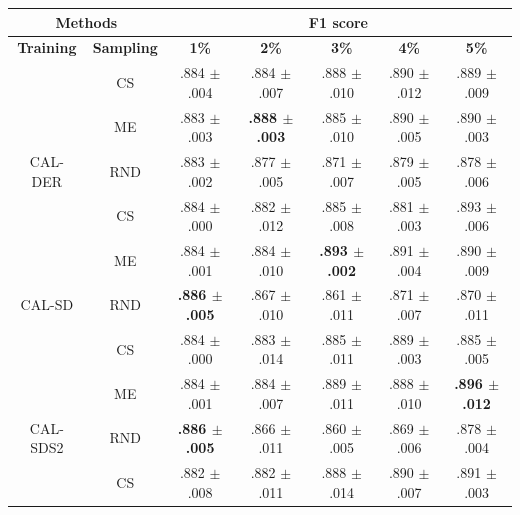 \begin{table}[htbp]
\centering

\begin{tabular*}{\linewidth}{c|c|@{\extracolsep{\fill}}ccccc}
\toprule
\multicolumn{2}{c|}{\textbf{Methods}} & \multicolumn{5}{c}{\textbf{F1 score}} \\
\midrule
\textbf{Training} & \textbf{Sampling} & \textbf{1\%} & \textbf{2\%} & \textbf{3\%} & \textbf{4\%} & \textbf{5\%}\\
\midrule
 & CS & .884 $\pm$ {\small .004} & .884 $\pm$ {\small .007} & .888 $\pm$ {\small .010} & .890 $\pm$ {\small .012} & .889 $\pm$ {\small .009}\\

 & ME & .883 $\pm$ {\small .003} & \textbf{.888 $\pm$ {\small .003}} & .885 $\pm$ {\small .010} & .890 $\pm$ {\small .005} & .890 $\pm$ {\small .003}\\

\multirow{-3}{*}{\raggedright\arraybackslash CAL-DER} & RND & .883 $\pm$ {\small .002} & .877 $\pm$ {\small .005} & .871 $\pm$ {\small .007} & .879 $\pm$ {\small .005} & .878 $\pm$ {\small .006}\\
\midrule
 & CS & .884 $\pm$ {\small .000} & .882 $\pm$ {\small .012} & .885 $\pm$ {\small .008} & .881 $\pm$ {\small .003} & .893 $\pm$ {\small .006}\\

 & ME & .884 $\pm$ {\small .001} & .884 $\pm$ {\small .010} & \textbf{.893 $\pm$ {\small .002}} & .891 $\pm$ {\small .004} & .890 $\pm$ {\small .009}\\

\multirow{-3}{*}{\raggedright\arraybackslash CAL-SD} & RND & \textbf{.886 $\pm$ {\small .005}} & .867 $\pm$ {\small .010} & .861 $\pm$ {\small .011} & .871 $\pm$ {\small .007} & .870 $\pm$ {\small .011}\\
\midrule
 & CS & .884 $\pm$ {\small .000} & .883 $\pm$ {\small .014} & .885 $\pm$ {\small .011} & .889 $\pm$ {\small .003} & .885 $\pm$ {\small .005}\\

 & ME & .884 $\pm$ {\small .001} & .884 $\pm$ {\small .007} & .889 $\pm$ {\small .011} & .888 $\pm$ {\small .010} & \textbf{.896 $\pm$ {\small .012}}\\

\multirow{-3}{*}{\raggedright\arraybackslash CAL-SDS2} & RND & \textbf{.886 $\pm$ {\small .005}} & .866 $\pm$ {\small .011} & .860 $\pm$ {\small .005} & .869 $\pm$ {\small .006} & .878 $\pm$ {\small .004}\\
\midrule
 & CS & .882 $\pm$ {\small .008} & .882 $\pm$ {\small .011} & .888 $\pm$ {\small .014} & .890 $\pm$ {\small .007} & .891 $\pm$ {\small .003}\\


\end{tabular*}
\end{table}
